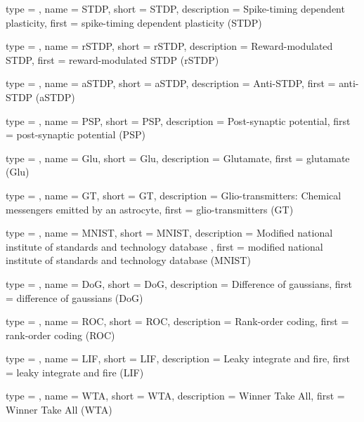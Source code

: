 {
	type        = \acronymtype,
	name        = {STDP},
	short       = {STDP},
	description = {Spike-timing dependent plasticity},
	first       = {spike-timing dependent plasticity (STDP)}
}

{
	type        = \acronymtype,
	name        = {rSTDP},
	short       = {rSTDP},
	description = {Reward-modulated STDP},
	first       = {reward-modulated STDP (rSTDP)}
}

{
	type        = \acronymtype,
	name        = {aSTDP},
	short       = {aSTDP},
	description = {Anti-STDP},
	first       = {anti-STDP (aSTDP)}
}

{
	type        = \acronymtype,
	name        = {PSP},
	short       = {PSP},
	description = {Post-synaptic potential},
	first       = {post-synaptic potential (PSP)}
}

{
	type        = \acronymtype,
	name        = {Glu},
	short       = {Glu},
	description = {Glutamate},
	first       = {glutamate (Glu)}
}

{
	type        = \acronymtype,
	name        = {GT},
	short       = {GT},
	description = {Glio-transmitters: Chemical messengers emitted by an astrocyte},
	first       = {glio-transmitters (GT)}
}

{
	type        = \acronymtype,
	name        = {MNIST},
	short       = {MNIST},
	description = {Modified national institute of standards and technology database },   
	first       = {modified national institute of standards and technology database (MNIST)}
}

{
	type        = \acronymtype,
	name        = {DoG},
	short       = {DoG},
	description = {Difference of gaussians},
	first       = {difference of gaussians (DoG)}
}

{
	type        = \acronymtype,
	name        = {ROC},
	short       = {ROC},
	description = {Rank-order coding},
	first       = {rank-order coding (ROC)}
}

{
	type        = \acronymtype,
	name        = {LIF},
	short       = {LIF},
	description = {Leaky integrate and fire},
	first       = {leaky integrate and fire (LIF)}
}

{
	type        = \acronymtype,
	name        = {WTA},
	short       = {WTA},
	description = {Winner Take All},
	first       = {Winner Take All (WTA)}
}

